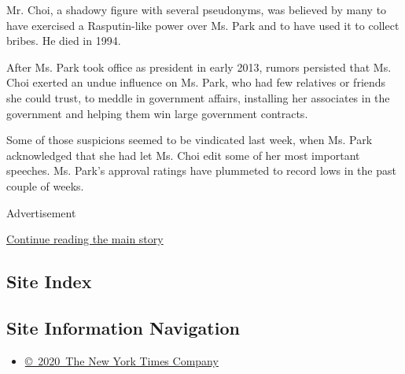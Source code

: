 Mr. Choi, a shadowy figure with several pseudonyms, was believed by many
to have exercised a Rasputin-like power over Ms. Park and to have used
it to collect bribes. He died in 1994.

After Ms. Park took office as president in early 2013, rumors persisted
that Ms. Choi exerted an undue influence on Ms. Park, who had few
relatives or friends she could trust, to meddle in government affairs,
installing her associates in the government and helping them win large
government contracts.

Some of those suspicions seemed to be vindicated last week, when Ms.
Park acknowledged that she had let Ms. Choi edit some of her most
important speeches. Ms. Park's approval ratings have plummeted to record
lows in the past couple of weeks.

Advertisement

\protect\hyperlink{after-bottom}{Continue reading the main story}

\hypertarget{site-index}{%
\subsection{Site Index}\label{site-index}}

\hypertarget{site-information-navigation}{%
\subsection{Site Information
Navigation}\label{site-information-navigation}}

\begin{itemize}
\tightlist
\item
  \href{https://help.nytimes3xbfgragh.onion/hc/en-us/articles/115014792127-Copyright-notice}{©~2020~The
  New York Times Company}
\end{itemize}

